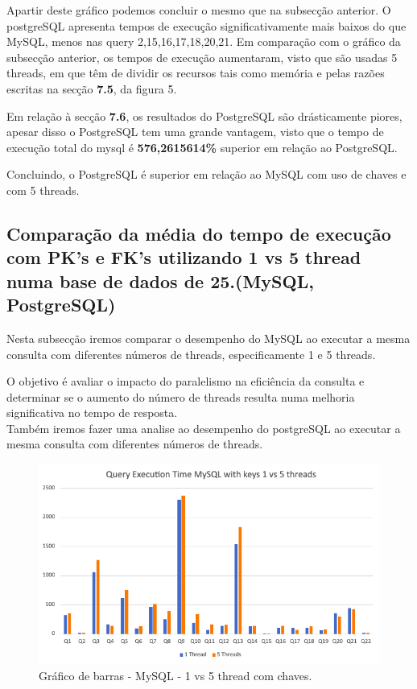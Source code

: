 \documentclass{article}
\begin{document}
Apartir deste gráfico podemos concluir o mesmo que na subsecção anterior. O postgreSQL apresenta tempos de execução significativamente mais baixos do que MySQL, menos nas query 2,15,16,17,18,20,21.
Em comparação com o gráfico da subsecção anterior, os tempos de execução aumentaram, visto que são usadas 5 threads, em que têm de dividir os recursos tais como memória e pelas razões escritas na secção \textbf{7.5}, da figura 5. 

Em relação à secção \textbf{7.6}, os resultados do PostgreSQL são drásticamente piores, apesar disso o PostgreSQL tem uma grande vantagem, visto que o tempo de execução total do mysql é \textbf{576,2615614\%} superior em relação ao PostgreSQL.

Concluindo, o PostgreSQL é superior em relação ao MySQL com uso de chaves e com 5 threads.
\clearpage
  \subsection{Comparação da média do tempo de execução com PK's e FK's
  utilizando 1 vs 5 thread numa base de dados de 25.(MySQL, PostgreSQL)}
  
  \texttt{}\par Nesta subsecção iremos comparar o desempenho do MySQL ao executar a mesma consulta com diferentes números de threads, especificamente 1 e 5 threads. 
  
  O objetivo é avaliar o impacto do paralelismo na eficiência da consulta e determinar se o aumento do número de threads resulta numa melhoria significativa no tempo de resposta.\\

  Também iremos fazer uma analise ao desempenho do postgreSQL ao executar a mesma consulta com diferentes números de threads.

  \begin{figure}[H]
    \centering
    \includegraphics[width=\textwidth]{Graphs/mysql_withkeys_1vs5threads.png}
    \caption{Gráfico de barras - MySQL - 1 vs 5 thread com chaves.} 
    \label{fig:PKCreation2}

  \end{figure}
\end{document}
